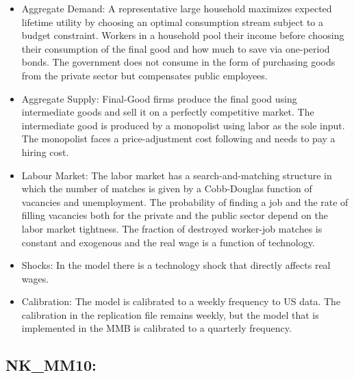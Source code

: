 \documentclass[11pt,a4paper]{article}
\begin{document}
	\begin{itemize}
		\item Aggregate Demand: A representative large household maximizes expected lifetime utility by choosing an optimal consumption stream subject to a budget constraint. Workers in a household pool their income before choosing their consumption of the final good and how much to save via one-period bonds. The government does not consume in the form of purchasing goods from the private sector but compensates public employees.
		
		\item Aggregate Supply: Final-Good firms produce the final good using intermediate goods and sell it on a perfectly competitive market. The intermediate good is produced by a monopolist using labor as the sole input. The monopolist faces a price-adjustment cost following \cite{Rotemberg1982} and needs to pay a hiring cost.
		
		\item Labour Market: The labor market has a search-and-matching structure in which the number of matches is given by a Cobb-Douglas function of vacancies and unemployment. The probability of finding a job and the rate of filling vacancies both for the private and the public sector depend on the labor market tightness. The fraction of destroyed worker-job matches is constant and exogenous and the real wage is a function of technology.
		
		\item Shocks: In the model there is a technology shock that directly affects real wages.
		
		\item Calibration: The model is calibrated to a weekly frequency to US data. The calibration in the replication file remains weekly, but the model that is implemented in the MMB is calibrated to a quarterly frequency.
	\end{itemize}
	
	
	
	
	
	\subsection{NK\_MM10: \texorpdfstring{\cite{MehMoran2010}}{Meh and Moran (2010)}}
	\label{NKMM10}
	
\end{document}
